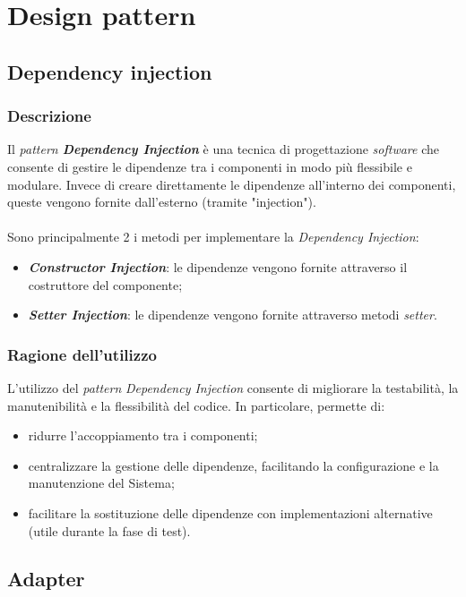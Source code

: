 \section{Design pattern}

\subsection{Dependency injection}

\subsubsection{Descrizione}
Il \textit{pattern \textbf{Dependency Injection}} è una tecnica di progettazione \textit{software} che consente di gestire le dipendenze tra i componenti in modo più flessibile 
e modulare. Invece di creare direttamente le dipendenze all'interno dei componenti, queste vengono fornite dall'esterno (tramite "injection"). \\ \\
Sono principalmente 2 i metodi per implementare la \textit{Dependency Injection}:
\begin{itemize}
    \item \textit{\textbf{Constructor Injection}}: le dipendenze vengono fornite attraverso il costruttore del componente;
    \item \textit{\textbf{Setter Injection}}: le dipendenze vengono fornite attraverso metodi \textit{setter}.
\end{itemize}

\subsubsection{Ragione dell'utilizzo}
L'utilizzo del \textit{pattern} \textit{Dependency Injection} consente di migliorare la testabilità, la manutenibilità e la flessibilità del codice.
In particolare, permette di:
\begin{itemize}
    \item ridurre l'accoppiamento tra i componenti;
    \item centralizzare la gestione delle dipendenze, facilitando la configurazione e la manutenzione del Sistema;
    \item facilitare la sostituzione delle dipendenze con implementazioni alternative (utile durante la fase di test).
\end{itemize}

\subsection{Adapter}

